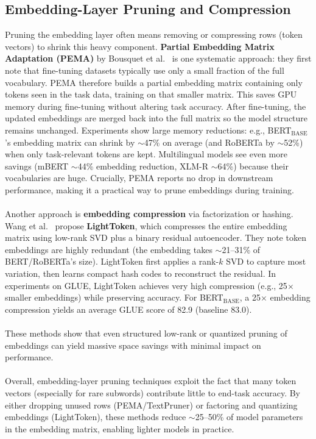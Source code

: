 \documentclass[twocolumn]{article}
\begin{document}
\subsection{Embedding-Layer Pruning and Compression}
Pruning the embedding layer often means removing or compressing rows (token vectors) to shrink this heavy component. \textbf{Partial Embedding Matrix Adaptation (PEMA)} by Bousquet et al.~\cite{bousquet2023pema} is one systematic approach: they first note that fine-tuning datasets typically use only a small fraction of the full vocabulary. PEMA therefore builds a partial embedding matrix containing only tokens seen in the task data, training on that smaller matrix. This saves GPU memory during fine-tuning without altering task accuracy. After fine-tuning, the updated embeddings are merged back into the full matrix so the model structure remains unchanged. Experiments show large memory reductions: e.g., BERT$_{\text{BASE}}$'s embedding matrix can shrink by $\sim$47\% on average (and RoBERTa by $\sim$52\%) when only task-relevant tokens are kept. Multilingual models see even more savings (mBERT $\sim$44\% embedding reduction, XLM-R $\sim$64\%) because their vocabularies are huge. Crucially, PEMA reports no drop in downstream performance, making it a practical way to prune embeddings during training.
\\ \\
Another approach is \textbf{embedding compression} via factorization or hashing. Wang et al.~\cite{wang2023lighttoken} propose \textbf{LightToken}, which compresses the entire embedding matrix using low-rank SVD plus a binary residual autoencoder. They note token embeddings are highly redundant (the embedding takes $\sim$21--31\% of BERT/RoBERTa's size). LightToken first applies a rank-$k$ SVD to capture most variation, then learns compact hash codes to reconstruct the residual. In experiments on GLUE, LightToken achieves very high compression (e.g., 25$\times$ smaller embeddings) while preserving accuracy. For BERT$_{\text{BASE}}$, a 25$\times$ embedding compression yields an average GLUE score of 82.9 (baseline 83.0).
\\ \\
These methods show that even structured low-rank or quantized pruning of embeddings can yield massive space savings with minimal impact on performance.
\\ \\
Overall, embedding-layer pruning techniques exploit the fact that many token vectors (especially for rare subwords) contribute little to end-task accuracy. By either dropping unused rows (PEMA/TextPruner) or factoring and quantizing embeddings (LightToken), these methods reduce $\sim$25--50\% of model parameters in the embedding matrix, enabling lighter models in practice.
\end{document}
